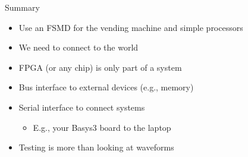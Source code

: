 \begin{frame}[fragile]{Summary}
\begin{itemize}
\item Use an FSMD for the vending machine and simple processors
\item We need to connect to the world
\item FPGA (or any chip) is only part of a system
\item Bus interface to external devices (e.g., memory)
\item Serial interface to connect systems
\begin{itemize}
\item E.g., your Basys3 board to the laptop
\end{itemize}
\item Testing is more than looking at waveforms
\end{itemize}
\end{frame}





